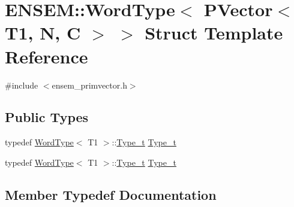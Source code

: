 \hypertarget{structENSEM_1_1WordType_3_01PVector_3_01T1_00_01N_00_01C_01_4_01_4}{}\section{E\+N\+S\+EM\+:\+:Word\+Type$<$ P\+Vector$<$ T1, N, C $>$ $>$ Struct Template Reference}
\label{structENSEM_1_1WordType_3_01PVector_3_01T1_00_01N_00_01C_01_4_01_4}


{\ttfamily \#include $<$ensem\+\_\+primvector.\+h$>$}

\subsection*{Public Types}
\begin{DoxyCompactItemize}
\item 
typedef \mbox{\hyperlink{structENSEM_1_1WordType}{Word\+Type}}$<$ T1 $>$\+::\mbox{\hyperlink{structENSEM_1_1WordType_3_01PVector_3_01T1_00_01N_00_01C_01_4_01_4_aa9f3aa443de1a825586cd47f6d842fe8}{Type\+\_\+t}} \mbox{\hyperlink{structENSEM_1_1WordType_3_01PVector_3_01T1_00_01N_00_01C_01_4_01_4_aa9f3aa443de1a825586cd47f6d842fe8}{Type\+\_\+t}}
\item 
typedef \mbox{\hyperlink{structENSEM_1_1WordType}{Word\+Type}}$<$ T1 $>$\+::\mbox{\hyperlink{structENSEM_1_1WordType_3_01PVector_3_01T1_00_01N_00_01C_01_4_01_4_aa9f3aa443de1a825586cd47f6d842fe8}{Type\+\_\+t}} \mbox{\hyperlink{structENSEM_1_1WordType_3_01PVector_3_01T1_00_01N_00_01C_01_4_01_4_aa9f3aa443de1a825586cd47f6d842fe8}{Type\+\_\+t}}
\end{DoxyCompactItemize}


\subsection{Member Typedef Documentation}
\mbox{\label{structENSEM_1_1WordType_3_01PVector_3_01T1_00_01N_00_01C_01_4_01_4_aa9f3aa443de1a825586cd47f6d842fe8}} 
